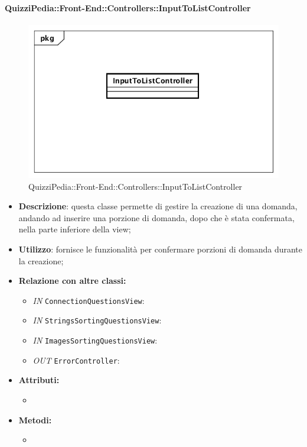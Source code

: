 \paragraph{QuizziPedia::Front-End::Controllers::InputToListController}
\begin{figure}
	\centering
	\includegraphics[scale=0.45]{UML/Classi/Front-End/QuizziPedia_Front-end_Controller_InputToListController.png}
	\caption{QuizziPedia::Front-End::Controllers::InputToListController}
\end{figure}
\begin{itemize}
	\item \textbf{Descrizione}: questa classe permette di gestire la creazione di una domanda, andando ad inserire una porzione di domanda, dopo che è stata confermata, nella parte inferiore della view;
	\item \textbf{Utilizzo}: fornisce le funzionalità per confermare porzioni di domanda durante la creazione;
	\item \textbf{Relazione con altre classi:}
	\begin{itemize}
		\item \textit{IN} \texttt{ConnectionQuestionsView}:
		\item \textit{IN} \texttt{StringsSortingQuestionsView}:  
		\item \textit{IN} \texttt{ImagesSortingQuestionsView}:  
		\item \textit{OUT} \texttt{ErrorController}:   
	\end{itemize}
	\item \textbf{Attributi:}
	\begin{itemize}
		\item 
	\end{itemize}
	\item \textbf{Metodi:}
	\begin{itemize}
		\item 
	\end{itemize}
\end{itemize}

